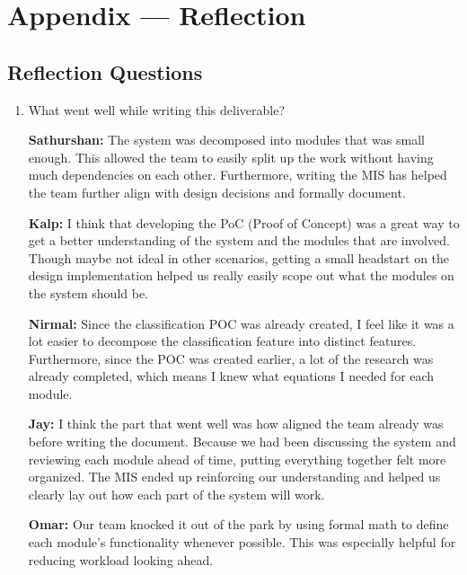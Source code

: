 \documentclass[12pt, titlepage]{article}
\begin{document}
\newpage 





\newpage{}

\section*{Appendix --- Reflection}

\subsection*{Reflection Questions}

\begin{enumerate}
  \item What went well while writing this deliverable? 
  
  \textbf{Sathurshan:} The system was decomposed into modules that was small
  enough. This allowed the team to easily split up the work without having much
  dependencies on each other. Furthermore, writing the MIS has helped the team
  further align with design decisions and formally document.

  \textbf{Kalp:} I think that developing the PoC (Proof of Concept) was a great
  way to get a better understanding of the system and the modules that are
  involved. Though maybe not ideal in other scenarios, getting a small headstart
  on the design implementation helped us really easily scope out what the
  modules on the system should be.

  \textbf{Nirmal:} Since the classification POC was already created, I feel like
  it was a lot easier to decompose the classification feature into distinct
  features. Furthermore, since the POC was created earlier, a lot of the
  research was already completed, which means I knew what equations I needed for
  each module. 

  \textbf{Jay:} I think the part that went well was how aligned the team already
  was before writing the document. Because we had been discussing the system and
  reviewing each module ahead of time, putting everything together felt more
  organized. The MIS ended up reinforcing our understanding and helped us
  clearly lay out how each part of the system will work.

  \textbf{Omar: } Our team knocked it out of the park by using formal math to
  define each module's functionality whenever possible. This was especially
  helpful for reducing workload looking ahead. 


\end{enumerate}
\end{document}
